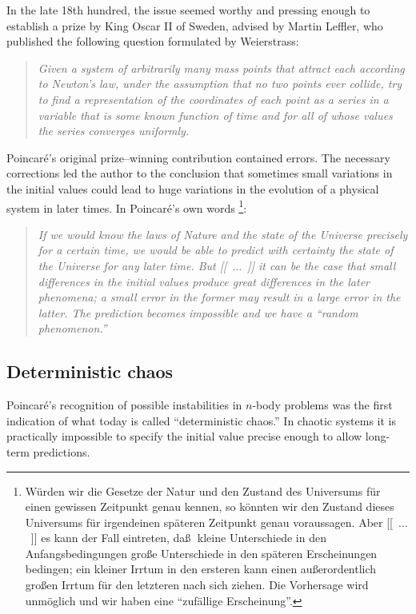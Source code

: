 \documentclass[rmp,amsfonts,showpacs,showkeys]{revtex4}
\begin{document}
In the late 18th hundred,
the issue seemed worthy and pressing enough to establish a prize by
King Oscar II of Sweden, advised by Martin Leffler, who published the following
question formulated by Weierstrass:
\begin{quote}
{\em
Given a system of arbitrarily many mass points that attract each
according to Newton's law, under the assumption that no two points ever collide,
try to find a representation of the coordinates of each point
as a series in a variable that is some known function of time and for
all of whose values the series converges uniformly.
}
\end{quote}
Poincar{\'e}'s original prize--winning contribution contained errors.
The necessary corrections led the author to the conclusion that sometimes small
variations in the initial values could lead to huge variations in the
evolution of a physical system in later times.
In Poincar{\'e}'s own words  \cite[Chapter 4, Sect. II, pp. 56-57]{poincare14}\footnote{
W\"urden wir die Gesetze der Natur und den Zustand des Universums
f\"ur einen gewissen Zeitpunkt genau kennen, so
k\"onnten wir den Zustand dieses Universums f\"ur
irgendeinen sp\"ateren Zeitpunkt genau voraussagen.
Aber
[[~$\ldots$~]]
 es kann der Fall eintreten,
da\ss $\;$ kleine Unterschiede in den Anfangsbedingungen
gro\ss e Unterschiede in den sp\"ateren Erscheinungen bedingen;
ein kleiner Irrtum in den ersteren kann einen au\ss erordentlich gro\ss en
Irrtum f\"ur den letzteren nach sich ziehen.
Die Vorhersage wird unm\"oglich und wir haben eine
``zuf\"allige Erscheinung''.}:
\begin{quote}
{\em
If we would know the laws of Nature and the state of the Universe precisely
for a certain time,
we would be able to predict with certainty
the state of the Universe for any later time.
But
[[~$\ldots$~]]
it can be the case that small differences in the initial values
produce great differences in the later phenomena;
a small error in the former may result in a large error in the latter.
The prediction becomes impossible and we have a ``random phenomenon.''}
\end{quote}

\subsection{Deterministic chaos}

Poincar{\'e}'s recognition of possible instabilities
in $n$-body problems was the first indication of what today is called ``deterministic chaos.''
In chaotic systems it is practically impossible to specify
the initial value precise enough to allow long-term predictions.
\end{document}
